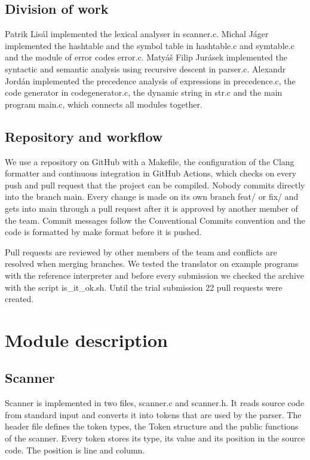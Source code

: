 \documentclass[a4paper,11pt]{article}
\begin{document}
\subsection{Division of work}

Patrik Lisál implemented the lexical analyser in scanner.c. Michal Jáger
implemented the hashtable and the symbol table in hashtable.c and
symtable.c and the module of error codes error.c. Matyáš Filip Jurásek
implemented the syntactic and semantic analysis using recursive descent in
parser.c. Alexandr Jordán implemented the precedence analysis of expressions in
precedence.c, the code generator in codegenerator.c, the dynamic string
in str.c and the main program main.c, which connects all modules
together.

\subsection{Repository and workflow}

We use a repository on GitHub with a Makefile, the configuration of the Clang
formatter and continuous integration in GitHub Actions, which checks on every push and
pull request that the project can be compiled. Nobody commits directly into the branch
main. Every change is made on its own branch feat/ or fix/ and gets into main through a
pull request after it is approved by another member of the team. Commit messages follow
the Conventional Commits convention and the code is formatted by make format before it
is pushed.

Pull requests are reviewed by other members of the team and conflicts are resolved
when merging branches. We tested the translator on example programs with the reference
interpreter and before every submission we checked the archive with the script
is\_it\_ok.sh. Until the trial submission 22 pull requests were created.

\section{Module description}

\subsection{Scanner}

Scanner is implemented in two files, scanner.c and scanner.h. It reads
source code from standard input and converts it into tokens that are used by the parser.
The header file defines the token types, the Token structure and the public
functions of the scanner. Every token stores its type, its value and its position in the
source code. The position is line and column.
\end{document}
